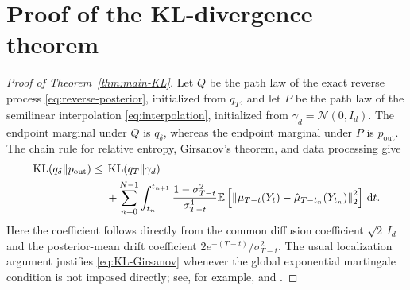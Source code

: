 \documentclass[11pt]{article}
\theoremstyle{definition}
\newcommand{\E}{\mathbb{E}}
\newcommand{\N}{\mathcal{N}}
\newcommand{\Id}{I_d}
\newcommand{\norm}[1]{\left\lVert #1\right\rVert_2}
\newcommand{\KL}{\operatorname{KL}}
\newcommand{\dd}{\,\mathrm{d}}
\begin{document}
\section{Proof of the KL-divergence theorem}
\label{app:KL}

\begin{proof}[Proof of Theorem~\ref{thm:main-KL}]
Let $Q$ be the path law of the exact reverse process
\eqref{eq:reverse-posterior}, initialized from $q_T$, and let $P$ be
the path law of the semilinear interpolation \eqref{eq:interpolation},
initialized from $\gamma_d=\N(0,\Id)$. The endpoint marginal under
$Q$ is $q_\delta$, whereas the endpoint marginal under $P$ is
$p_{\mathrm{out}}$. The chain rule for relative entropy, Girsanov's
theorem, and data processing give
\begin{align}
    \KL(q_\delta\Vert p_{\mathrm{out}})
    \le{}&
    \KL(q_T\Vert\gamma_d)
    \notag\\
    &+
    \sum_{n=0}^{N-1}
    \int_{t_n}^{t_{n+1}}
    \frac{1-\sigma_{T-t}^2}{\sigma_{T-t}^4}
    \E\left[
       \norm{
          \mu_{T-t}(Y_t)
          -\hat\mu_{T-t_n}(Y_{t_n})
       }^2
    \right]\dd t.
    \label{eq:KL-Girsanov}
\end{align}
Here the coefficient follows directly from the common diffusion
coefficient $\sqrt2\,\Id$ and the posterior-mean drift coefficient
$2e^{-(T-t)}/\sigma_{T-t}^2$. The usual localization argument
justifies \eqref{eq:KL-Girsanov} whenever the global exponential
martingale condition is not imposed directly; see, for example,
\citet{benton2024nearly} and \citet{huang2026optimal}.


\end{proof}
\end{document}
